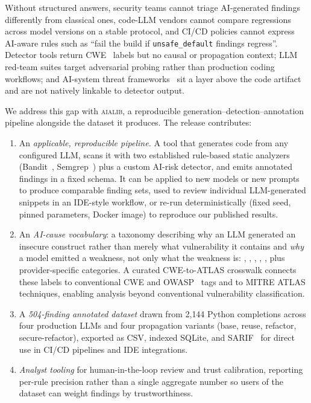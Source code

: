 \documentclass[sigconf,review,anonymous=false]{acmart}
\begin{document}
Without structured answers, security teams cannot triage AI-generated
findings differently from classical ones, code-LLM vendors cannot
compare regressions across model versions on a stable protocol, and
CI/CD policies cannot express AI-aware rules such as ``fail the build
if \texttt{unsafe\_default} findings regress''. Detector
tools return CWE~\cite{cwe} labels but no causal
or propagation context; LLM red-team suites target adversarial probing rather than production coding workflows; and
AI-system threat frameworks~\cite{mitreatlas} sit a layer above the
code artifact and are not natively linkable to detector output.

We address this gap with \textsc{aialib}, a
reproducible generation--detection--annotation pipeline alongside the
dataset it produces. The release contributes:
\begin{enumerate}[leftmargin=*, topsep=5pt, itemsep=6pt,
                  parsep=0pt, partopsep=0pt]
  \item An \emph{applicable, reproducible pipeline.} A tool that
        generates code from any configured LLM, scans it with two established rule-based static analyzers (Bandit~\cite{bandit}, Semgrep~\cite{semgrep}) plus a custom AI-risk detector, and emits
        annotated findings in a fixed schema. It can be applied to new
        models or new prompts to produce comparable finding sets, used
        to review individual LLM-generated snippets in an IDE-style
        workflow, or re-run deterministically (fixed seed, pinned
        parameters, Docker image) to reproduce our published results.
  \item An \emph{AI-cause vocabulary}: a taxonomy describing why an LLM        generated an insecure construct rather than merely what                vulnerability it contains and \emph{why} a model
        emitted a weakness, not only what the weakness is:
        , ,
        ,  ,
        , plus provider-specific
        categories. A curated CWE-to-ATLAS crosswalk connects these
        labels to conventional CWE and OWASP~\cite{owasptop10} tags and to MITRE ATLAS
        techniques, enabling analysis beyond conventional vulnerability classification.
  \item A \emph{504-finding annotated dataset} drawn from 2{,}144
        Python completions across four production LLMs and four
        propagation variants (base, reuse, refactor, secure-refactor),
        exported as CSV, indexed SQLite, and SARIF~\cite{sarif} for direct use in
        CI/CD pipelines and IDE integrations.
  \item \emph{Analyst tooling} for human-in-the-loop review and trust
      calibration, reporting per-rule precision rather than a single
      aggregate number so users of the dataset can weight findings by
      trustworthiness.
\end{enumerate}
\end{document}
